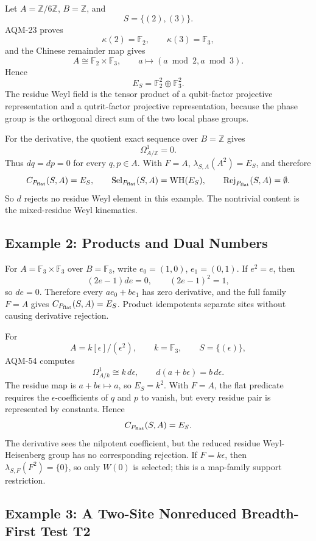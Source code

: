 Let \(A=\mathbb Z/6\mathbb Z\), \(B=\mathbb Z\), and
\[
  S=\{(2),(3)\}.
\]
AQM-23 proves
\[
  \kappa(2)=\mathbb F_2,\qquad \kappa(3)=\mathbb F_3,
\]
and the Chinese remainder map gives
\[
  A\cong\mathbb F_2\times\mathbb F_3,\qquad
  a\mapsto(a\bmod2,a\bmod3).
\]
Hence
\[
  E_S=\mathbb F_2^2\oplus\mathbb F_3^2 .
\]
The residue Weyl field is the tensor product of a qubit-factor projective
representation and a qutrit-factor projective representation, because the
phase group is the orthogonal direct sum of the two local phase groups.

For the derivative, the quotient exact sequence over \(B=\mathbb Z\) gives
\[
  \Omega^1_{A/\mathbb Z}=0.
\]
Thus \(dq=dp=0\) for every \(q,p\in A\).  With \(F=A\),
\(\lambda_{S,A}(A^2)=E_S\), and therefore
\[
  C_{P_{\rm flat}}(S,A)=E_S,\qquad
  \operatorname{Sel}_{P_{\rm flat}}(S,A)=\operatorname{WH}(E_S),\qquad
  \operatorname{Rej}_{P_{\rm flat}}(S,A)=\emptyset .
\]
So \(d\) rejects no residue Weyl element in this example.  The nontrivial
content is the mixed-residue Weyl kinematics.

\subsection{Example 2: Products and Dual Numbers}

For \(A=\mathbb F_3\times\mathbb F_3\) over \(B=\mathbb F_3\), write
\(e_0=(1,0)\), \(e_1=(0,1)\).  If \(e^2=e\), then
\[
  (2e-1)de=0,\qquad (2e-1)^2=1,
\]
so \(de=0\).  Therefore every \(ae_0+be_1\) has zero derivative, and the full
family \(F=A\) gives \(C_{P_{\rm flat}}(S,A)=E_S\).  Product idempotents
separate sites without causing derivative rejection.

For
\[
  A=k[\epsilon]/(\epsilon^2),\qquad k=\mathbb F_3,\qquad S=\{(\epsilon)\},
\]
AQM-54 computes
\[
  \Omega^1_{A/k}\cong k\,d\epsilon,\qquad
  d(a+b\epsilon)=b\,d\epsilon.
\]
The residue map is \(a+b\epsilon\mapsto a\), so \(E_S=k^2\).  With \(F=A\),
the flat predicate requires the \(\epsilon\)-coefficients of \(q\) and \(p\)
to vanish, but every residue pair is represented by constants.  Hence
\[
  C_{P_{\rm flat}}(S,A)=E_S.
\]
The derivative sees the nilpotent coefficient, but the reduced residue
Weyl-Heisenberg group has no corresponding rejection.  If \(F=k\epsilon\),
then \(\lambda_{S,F}(F^2)=\{0\}\), so only \(W(0)\) is selected; this is a
map-family support restriction.

\subsection{Example 3: A Two-Site Nonreduced Breadth-First Test T2}

